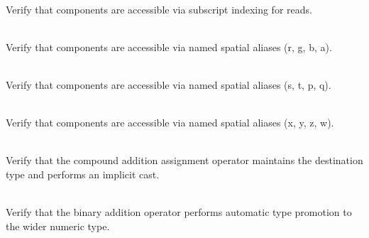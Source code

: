 \begin{DoxyRefList}
\item[{\parbox[t]{\linewidth}{Member \doxylink{group___f_g_m___vec4___access_gaa9c24a144611ff169cb8aeffabc13879}{Vector4\+DAccess\+\_\+\+Accessible\+As\+Array} ()}}]\hfill \\
\label{test__test000005}%
%
Verify that  components are accessible via subscript indexing for reads.  
\item[{\parbox[t]{\linewidth}{Member \doxylink{group___f_g_m___vec4___access_gabc2635e97434674a71f0a470cde0178d}{Vector4\+DAccess\+\_\+\+Accessible\+As\+RGBA} ()}}]\hfill \\
\label{test__test000004}%
%
Verify that  components are accessible via named spatial aliases (r, g, b, a).  
\item[{\parbox[t]{\linewidth}{Member \doxylink{group___f_g_m___vec4___access_ga1d4776b90945835ac95120f723607f9d}{Vector4\+DAccess\+\_\+\+Accessible\+As\+STPQ} ()}}]\hfill \\
\label{test__test000003}%
%
Verify that  components are accessible via named spatial aliases (s, t, p, q).  
\item[{\parbox[t]{\linewidth}{Member \doxylink{group___f_g_m___vec4___access_gaf9b19b8936062eecb39792dd3f286f24}{Vector4\+DAccess\+\_\+\+Accessible\+As\+XYZW} ()}}]\hfill \\
\label{test__test000002}%
%
Verify that  components are accessible via named spatial aliases (x, y, z, w).  
\item[{\parbox[t]{\linewidth}{Member \doxylink{group___f_g_m___vec4___addition_ga86708e36168b75a3f00feaa8834fb0d5}{Vector4\+DAddition\+\_\+\+Mixed\+Type\+Addition\+Assignment\+Does\+Not\+Promote\+Type} ()}}]\hfill \\
\label{test__test000020}%
%
Verify that the compound addition assignment operator maintains the destination type and performs an implicit cast.  
\item[{\parbox[t]{\linewidth}{Member \doxylink{group___f_g_m___vec4___addition_ga95048d1990144009fee5a994b00f37fb}{Vector4\+DAddition\+\_\+\+Mixed\+Type\+Addition\+Promotes\+Type} ()}}]\hfill \\
\label{test__test000019}%
%
Verify that the binary addition operator performs automatic type promotion to the wider numeric type.  

\end{DoxyRefList}
